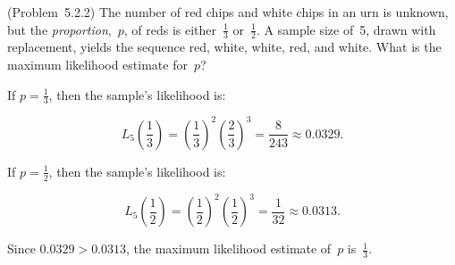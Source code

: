\begin{problem}
  (\textnormal{Problem~5.2.2}) The number of red chips and white chips in an urn is unknown, but the \textit{proportion},~$p$, of reds is either~$\frac{1}{3}$ or~$\frac{1}{2}$. A sample size of~5, drawn with replacement, yields the sequence red, white, white, red, and white.  What is the maximum likelihood estimate for~$p$?
\end{problem}

If ${p=\frac{1}{3}}$, then the sample's likelihood is:

\begin{equation}\label{eq:P01:1s3Likelihood}
  L_{5}\left(\frac{1}{3}\right) = \left(\frac{1}{3}\right)^2 \left( \frac{2}{3} \right)^{3} = \frac{8}{243} \approx 0.0329\text{.}
\end{equation}

\noindent
If ${p=\frac{1}{2}}$, then the sample's likelihood is:

\begin{equation}\label{eq:P01:1s2Likelihood}
  L_{5}\left(\frac{1}{2}\right) = \left(\frac{1}{2}\right)^2 \left( \frac{1}{2} \right)^{3} = \frac{1}{32} \approx 0.0313\text{.}
\end{equation}

\noindent
Since ${0.0329 > 0.0313}$, the maximum likelihood estimate of~$p$ is~$\boxed{\frac{1}{3}}$.
